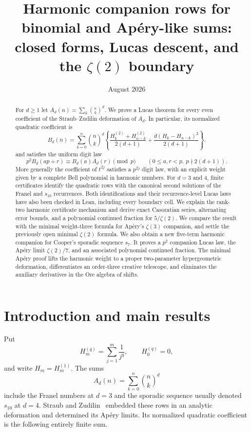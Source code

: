 \documentclass[11pt,reqno]{amsart}
\title[Harmonic companion rows]{Harmonic companion rows for binomial and
Ap\'ery-like sums:\\closed forms, Lucas descent, and the $\zeta(2)$ boundary}
\author{}
\date{August 2026}
\theoremstyle{definition}
\theoremstyle{remark}
\newcommand{\bin}[2]{\binom{#1}{#2}}
\newcommand{\Hd}[2]{H_{#1}^{(#2)}}
\newcommand{\Ad}[2]{A_{#1}(#2)}
\begin{document}
\begin{abstract}
For $d\geq1$ let $A_d(n)=\sum_k\binom nk^d$.  We prove a Lucas theorem for
every even coefficient of the Straub--Zudilin deformation of $A_d$.  In
particular, its normalized quadratic coefficient is
\[
 B_d(n)=\sum_{k=0}^n\binom nk^d\left\{
 \frac{H_k^{(2)}+H_{n-k}^{(2)}}{2(d+1)}
 +\frac{d(H_k-H_{n-k})^2}{2(d+1)}\right\}.
\]
and satisfies the uniform digit law
\[
 p^2B_d(ap+r)\equiv B_d(a)A_d(r)\pmod p
 \qquad(0\leq a,r<p,\ p\nmid2(d+1)).
\]
More generally the coefficient of $t^{2j}$ satisfies a $p^{2j}$ digit law,
with an explicit weight given by a complete Bell polynomial in harmonic
numbers.  For $d=3$ and $4$, finite certificates identify the quadratic rows with the
canonical second solutions of the Franel and $s_{10}$ recurrences.  Both
identifications and their recurrence-level Lucas laws have also been checked in
Lean, including every boundary cell.  We explain the rank-two harmonic
certificate mechanism and derive exact Casoratian series, alternating error
bounds, and a polynomial continued fraction for $5/\zeta(2)$.  We compare the
result with the minimal weight-three formula for
Ap\'ery's $\zeta(3)$ companion, and settle the previously open minimal
$\zeta(2)$ formula.  We also obtain a new five-term harmonic companion for
Cooper's sporadic sequence $s_7$.  It proves a $p^2$ companion Lucas law, the
Ap\'ery limit $\zeta(2)/7$, and an associated polynomial continued fraction.
The minimal Ap\'ery proof lifts the harmonic weight to a proper
two-parameter hypergeometric deformation, differentiates an order-three
creative telescope, and eliminates the auxiliary derivatives in the Ore
algebra of shifts.
\end{abstract}
\maketitle

\section{Introduction and main results}

Put
\[
 \Hd m q=\sum_{j=1}^m\frac1{j^q},\qquad \Hd 0q=0,
\]
and write $H_m=H_m^{(1)}$.  The sums
\[
 \Ad dn=\sum_{k=0}^n\bin nk^d
\]
include the Franel numbers at $d=3$ and the sporadic sequence usually denoted
$s_{10}$ at $d=4$.  Straub and Zudilin~\cite{StraubZudilin} embedded these rows
in an analytic deformation and determined its Ap\'ery limits.  Its normalized
quadratic coefficient is the following entirely finite sum.
\end{document}

